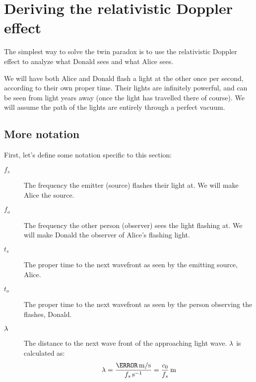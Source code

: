 \section{Deriving the relativistic Doppler effect}\label{sec:dopplerDerivation}
	The simplest way to solve the twin paradox is to use the relativistic Doppler effect to analyze what Donald sees and what Alice sees.

	We will have both Alice and Donald flash a light at the other once per second, according to their own proper time.
	Their lights are infinitely powerful, and can be seen from light years away (once the light has travelled there of course).
	We will assume the path of the lights are entirely through a perfect vacuum.
	\subsection{More notation}
		First, let's define some notation specific to this section:
		\begin{description}
			\item[$f_s$] The frequency the emitter (source) flashes their light at. We will make Alice the source.
			\item[$f_o$] The frequency the other person (observer) sees the light flashing at. We will make Donald the observer of Alice's flashing light.
			\item[$t_s$] The proper time to the next wavefront as seen by the emitting source, Alice.
			\item[$t_o$] The proper time to the next wavefront as seen by the person observing the flashes, Donald.
			\item[$\mathrm{\lambda}$] The distance to the next wave front of the approaching light wave. $\mathrm{\lambda}$ is calculated as:
			              \[\lam = \frac{\varSI{\clight}{\metre/\second}}{\varSI{f_s}{\per\second}} = \varSI{\frac{\si{\clight}}{f_s}}{\metre}\]
		\end{description}
